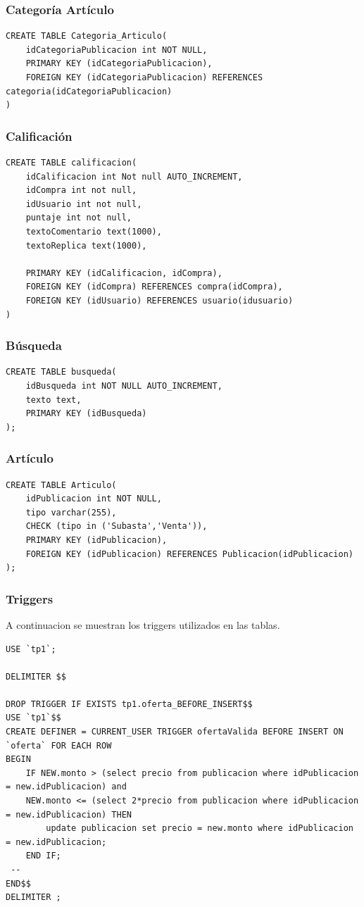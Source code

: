 \documentclass[a4paper, 10pt, twoside]{article}
\begin{document}
\subsubsection{Categor\'ia Art\'iculo}
\begin{verbatim}
CREATE TABLE Categoria_Articulo(
	idCategoriaPublicacion int NOT NULL,
    PRIMARY KEY (idCategoriaPublicacion),
    FOREIGN KEY (idCategoriaPublicacion) REFERENCES categoria(idCategoriaPublicacion)
)
\end{verbatim}
\subsubsection{Calificaci\'on}
\begin{verbatim}
CREATE TABLE calificacion(
	idCalificacion int Not null AUTO_INCREMENT,
    idCompra int not null,
    idUsuario int not null,
    puntaje int not null,
	textoComentario text(1000),
    textoReplica text(1000),
    
    PRIMARY KEY (idCalificacion, idCompra),
    FOREIGN KEY (idCompra) REFERENCES compra(idCompra),
    FOREIGN KEY (idUsuario) REFERENCES usuario(idusuario)
)
\end{verbatim}
\subsubsection{B\'usqueda}
\begin{verbatim}
CREATE TABLE busqueda(
	idBusqueda int NOT NULL AUTO_INCREMENT,
	texto text, 
	PRIMARY KEY	(idBusqueda)
);
\end{verbatim}
\subsubsection{Art\'iculo}
\begin{verbatim}
CREATE TABLE Articulo(
	idPublicacion int NOT NULL,
	tipo varchar(255), 
	CHECK (tipo in ('Subasta','Venta')),
	PRIMARY KEY	(idPublicacion),
	FOREIGN KEY (idPublicacion) REFERENCES Publicacion(idPublicacion)
);
\end{verbatim}
\newpage
\subsubsection{Triggers}
A continuacion se muestran los triggers utilizados en las tablas.
\begin{verbatim}
USE `tp1`;

DELIMITER $$

DROP TRIGGER IF EXISTS tp1.oferta_BEFORE_INSERT$$
USE `tp1`$$
CREATE DEFINER = CURRENT_USER TRIGGER ofertaValida BEFORE INSERT ON `oferta` FOR EACH ROW
BEGIN
	IF NEW.monto > (select precio from publicacion where idPublicacion = new.idPublicacion) and 
	NEW.monto <= (select 2*precio from publicacion where idPublicacion = new.idPublicacion) THEN
		update publicacion set precio = new.monto where idPublicacion = new.idPublicacion;
	END IF;
 -- 
END$$
DELIMITER ;

\end{verbatim}
\end{document}
